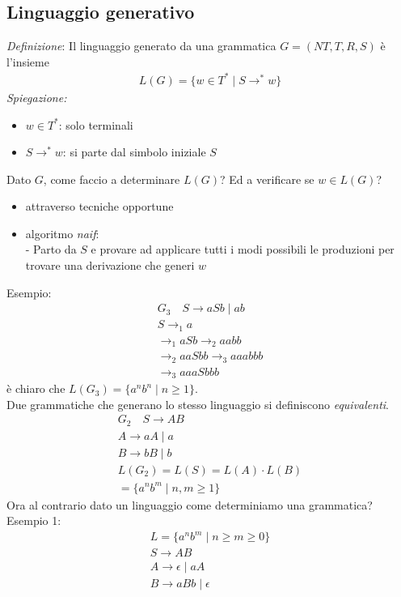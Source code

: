 \documentclass[a4paper,12pt]{article}
\begin{document}
\subsection{Linguaggio generativo}
\textit{Definizione}: Il linguaggio generato da una grammatica $G=(NT,T,R,S)$ è l'insieme 
\begin{align*}
  L(G)=\{w \in T^* \mid S \to^* w\}
\end{align*}
\textit{Spiegazione:} 
\begin{itemize}
  \item $w \in T^*$: solo terminali \\
  \item $S \to^* w$: si parte dal simbolo iniziale $S$
\end{itemize}
\vspace{1em}
Dato $G$, come faccio a determinare $L(G)$? Ed a verificare se $w \in L(G)$? 
\begin{itemize}
  \item attraverso tecniche opportune
  \item algoritmo \textit{naif}: \\
  - Parto da $S$ e provare ad applicare tutti i modi possibili le produzioni per trovare una derivazione che generi $w$
\end{itemize}
Esempio: \\
\begin{align*} 
  G_3 \quad S \to aSb \mid ab\\
  S \to_1 a \\
  \to_1 aSb \to_2 aabb \\
    \to_2 aaSbb \to_3 aaabbb \\
    \to_3 aaaSbbb
\end{align*}
è chiaro che $L(G_3)=\{a^nb^n \mid n \geq 1\}$. \\
Due grammatiche che generano lo stesso linguaggio si definiscono \textit{equivalenti}. \\
\begin{align*}
  G_2 \quad S \to AB \\
  A \to aA \mid a \\
  B \to bB \mid b \\
  L(G_2)=L(S)=L(A)\cdot L(B) \\
  = \{a^nb^m \mid n,m \geq 1 \}
\end{align*}
Ora al contrario dato un linguaggio come determiniamo una grammatica? \\
Esempio 1:
\begin{align*}
  L = \{a^nb^m \mid n \geq m \geq 0\} \\ 
  S \to AB \\
  A \to \epsilon \mid aA \\ 
  B \to aBb \mid \epsilon
\end{align*}
\end{document}
